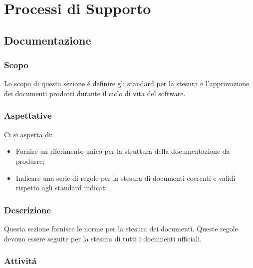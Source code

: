 \section{Processi di Supporto}
  \subsection{Documentazione}
  \subsubsection{Scopo}
  Lo scopo di questa sezione é definire gli standard per la stesura e l'approvazione dei documenti prodotti durante il ciclo di vita del software.

  \subsubsection{Aspettative}
  Ci si aspetta di:
  \begin{itemize}
    \item Fornire un riferimento unico per la struttura  della documentazione da produrre;
    \item Indicare una serie di regole per la stesura di documenti coerenti e validi rispetto agli standard indicati.
  \end{itemize}

  \subsubsection{Descrizione}
  Questa sezione fornisce le norme per la stesura dei documenti. Queste regole devono essere seguite per la stesura di tutti i documenti ufficiali.

  \subsubsection{Attivitá}
